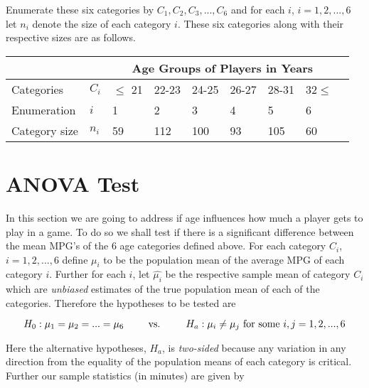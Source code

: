 \documentclass{article}
\begin{document}
Enumerate these six categories by $C_1,C_2,C_3,...,C_6$ and for each $i$, $i=1,2,...,6$ let $n_i$ denote the size of each category $i$. These six categories along with their respective sizes are as follows.
\begin{center}
\begin{tabular}{ |p{3cm}||p{1cm}|p{1cm}|p{1cm}|p{1cm}|p{1cm}|p{1cm}|p{1cm}|p{1cm}|| }
 \hline
 &&\multicolumn{6}{|c|}{Age Groups of Players in Years} \\
\hline
\hline
  Categories & $C_i$& $\leq$ 21&22-23 &24-25&26-27&28-31&32$\leq$ \\
\hline
Enumeration &$i$ &1&2&3&4&5&6\\
 \hline
Category size& $n_i$ & 59 & 112  &100 &93&105&60\\
\hline

\end{tabular}
\end{center}


\section*{ANOVA Test}
In this section we are going to address if age influences how much a player gets to play in a game. To do so we shall test if there is a significant difference between the mean MPG's of the 6 age categories defined above. For each category $C_i$, $i=1,2,...,6$ define $\mu_i$ to be the population mean of the average MPG of each category $i$. Further for each $i$, let $\widehat{\mu_i}$ be the respective sample mean of category $C_i$ which are \textit{unbiased} estimates of the true population mean of each of the categories. Therefore the hypotheses to be tested are

\begin{center} \begin{equation} H_0: \mu_1=\mu_2=...=\mu_6 \hspace{0.75cm} \text{ vs. } \hspace{0.75cm} H_a: \mu_i\neq \mu_j \text{ for some } i,j=1,2,...,6 
\end{equation} 
\end{center}

Here the alternative hypotheses, $H_a$,  is \textit{two-sided} because any variation in any direction from the equality of the population means of each category is critical. Further our sample statistics (in minutes) are given by 
\end{document}
